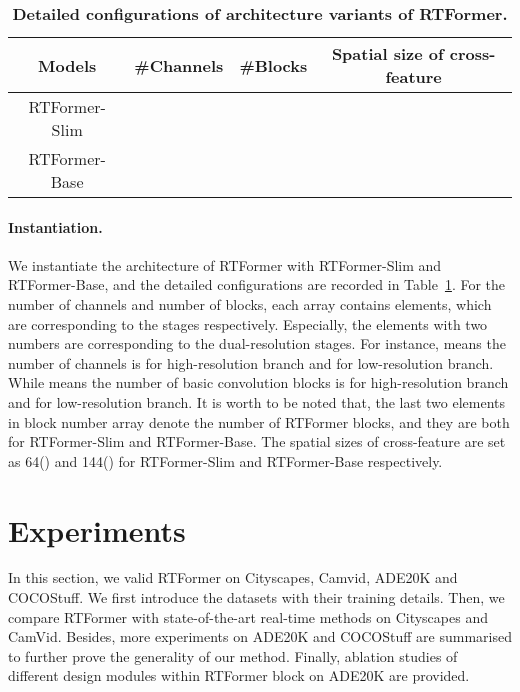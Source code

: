 \documentclass{article}
\begin{document}
\begin{table}
\centering
\caption{\textbf{Detailed configurations of architecture variants of RTFormer.}}
\begin{tabular}{c|c|c|c}
\toprule
Models & \#Channels & \#Blocks & Spatial size of cross-feature\\
\hline
RTFormer-Slim &  &  & \\
RTFormer-Base &  &  & \\
\bottomrule
\end{tabular}
\label{sample-tableArchitecture}
\end{table}

\vspace{-2mm}
\paragraph{Instantiation.}
We instantiate the architecture of RTFormer with RTFormer-Slim and RTFormer-Base, and the detailed configurations are recorded in Table~\ref{sample-tableArchitecture}. For the number of channels and number of blocks, each array contains  elements, which are corresponding to the  stages respectively. Especially, the elements with two numbers are corresponding to the dual-resolution stages. For instance,  means the number of channels is  for high-resolution branch and  for low-resolution branch. While  means the number of basic convolution blocks is  for high-resolution branch and  for low-resolution branch. It is worth to be noted that, the last two elements in block number array denote the number of RTFormer blocks, and they are both  for RTFormer-Slim and RTFormer-Base. The spatial sizes of cross-feature are set as 64() and 144() for RTFormer-Slim and RTFormer-Base respectively.


\section{Experiments}
In this section, we valid RTFormer on Cityscapes\cite{Cityscapes}, Camvid\cite{CamVid}, ADE20K\cite{ADE20K} and COCOStuff\cite{caesar2018coco}. We first introduce the datasets with their training details. Then, we compare RTFormer with state-of-the-art real-time methods on Cityscapes and CamVid. Besides, more experiments on ADE20K\cite{ADE20K} and COCOStuff\cite{caesar2018coco} are summarised to further prove the generality of our method. Finally, ablation studies of different design modules within RTFormer block on ADE20K\cite{ADE20K} are provided.
\end{document}
